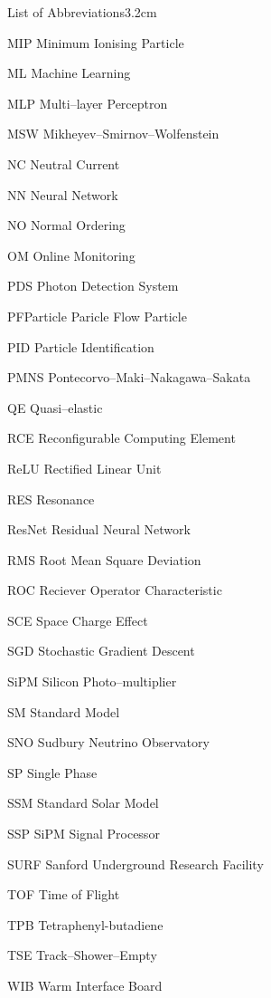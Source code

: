 \begin{mclistof}{List of Abbreviations}{3.2cm}
	\item [ MIP        ] {Minimum Ionising Particle}
	\item [ ML         ] {Machine Learning}
	\item [ MLP        ] {Multi--layer Perceptron}
	\item [ MSW        ] {Mikheyev--Smirnov--Wolfenstein}
	\item [ NC         ] {Neutral Current}
	\item [ NN         ] {Neural Network}
	\item [ NO         ] {Normal Ordering}
	\item [ OM         ] {Online Monitoring}
	\item [ PDS        ] {Photon Detection System}
	\item [ PFParticle ] {Paricle Flow Particle}
	\item [ PID        ] {Particle Identification}
	\item [ PMNS       ] {Pontecorvo--Maki--Nakagawa--Sakata}
	\item [ QE         ] {Quasi--elastic}
	\item [ RCE        ] {Reconfigurable Computing Element}
	\item [ ReLU       ] {Rectified Linear Unit}
	\item [ RES        ] {Resonance}
	\item [ ResNet     ] {Residual Neural Network}
	\item [ RMS        ] {Root Mean Square Deviation}
	\item [ ROC        ] {Reciever Operator Characteristic}
	\item [ SCE        ] {Space Charge Effect}
	\item [ SGD        ] {Stochastic Gradient Descent}
	\item [ SiPM       ] {Silicon Photo--multiplier}
	\item [ SM         ] {Standard Model}
	\item [ SNO        ] {Sudbury Neutrino Observatory}
	\item [ SP         ] {Single Phase}
	\item [ SSM        ] {Standard Solar Model}
	\item [ SSP        ] {SiPM Signal Processor}
	\item [ SURF       ] {Sanford Underground Research Facility}
	\item [ TOF        ] {Time of Flight}
	\item [ TPB        ] {Tetraphenyl-butadiene}
	\item [ TSE        ] {Track--Shower--Empty}
	\item [ WIB        ] {Warm Interface Board}
\end{mclistof} 
